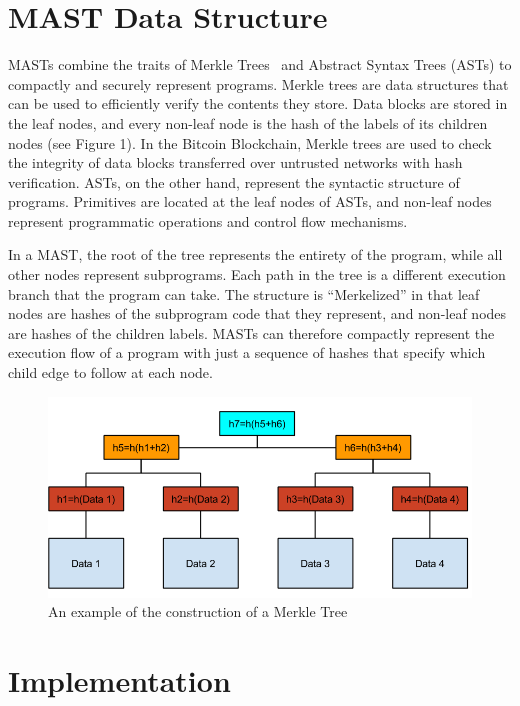 \documentclass{vldb}
\begin{document}
\section{MAST Data Structure}

MASTs combine the traits of Merkle Trees~\cite{merkle} and Abstract Syntax Trees (ASTs) to compactly and securely represent programs. Merkle trees are data structures that can be used to efficiently verify the contents they store. Data blocks are stored in the leaf nodes, and every non-leaf node is the hash of the labels of its children nodes (see Figure 1). In the Bitcoin Blockchain, Merkle trees are used to check the integrity of data blocks transferred over untrusted networks with hash verification. ASTs, on the other hand, represent the syntactic structure of programs. Primitives are located at the leaf nodes of ASTs, and non-leaf nodes represent programmatic operations and control flow mechanisms.
 
In a MAST, the root of the tree represents the entirety of the program, while all other nodes represent subprograms. Each path in the tree is a different execution branch that the program can take. The structure is “Merkelized” in that leaf nodes are hashes of the subprogram code that they represent, and non-leaf nodes are hashes of the children labels. MASTs can therefore compactly represent the execution flow of a program with just a sequence of hashes that specify which child edge to follow at each node.

\begin{figure}[h]
	\includegraphics[scale=.4]{merkle_tree}
	\caption{An example of the construction of a Merkle Tree}
	\label{merkle}
\end{figure}

\section{Implementation}
\end{document}
